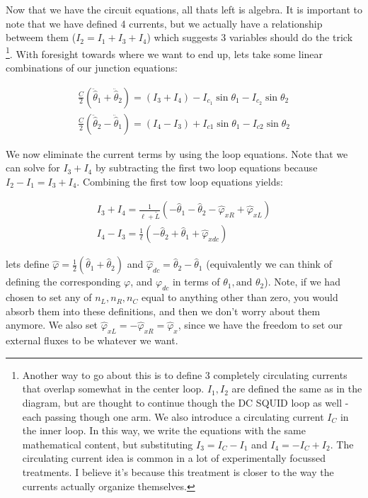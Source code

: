 \documentclass[paper=a4, twocolumn, fontsize=10pt]{article} %
\numberwithin{equation}{section} %
\numberwithin{figure}{section} %
\numberwithin{table}{section} %
\def \df#1{\hat{#1}}
\def \dl#1{#1}
\begin{document}
Now that we have the circuit equations, all thats left is algebra. It is important to note that we have defined 4 currents, but we actually have a relationship betweem them ($I_2 = I_1 + I_3 + I_4$) which suggests 3 variables should do the trick
\footnote{Another way to go about this is to define 3 completely circulating currents that overlap somewhat in the center loop. $I_1, I_2$ are defined the same as in the diagram, but are thought to continue though the DC SQUID loop as well - each passing though one arm. We also introduce a circulating current $I_C$ in the inner loop. In this way, we write the equations with the same mathematical content, but substituting $I_3 = I_C - I_1$ and $I_4 = -I_C + I_2$. The circulating current idea is common in a lot of experimentally focussed treatments. I believe it's because this treatment is closer to the way the currents actually organize themselves.}.
 With foresight towards where we want to end up, lets take some linear combinations of our junction equations:

\begin{align}
\frac{C}{2} (\ddot{\df\theta}_1 + \ddot{\df\theta}_2 ) = (I_3 + I_4) - I_{c_1} \sin \dl\theta_1 - I_{c_2} \sin \dl\theta_2
\\
\frac{C}{2} (\ddot{\df\theta}_2 - \ddot{\df\theta}_1 ) = (I_4 - I_3) +I_{c1} \sin\dl\theta_1 - I_{c2} \sin \dl\theta_2
\end{align}

We now eliminate the current terms by using the loop equations. Note that we can solve for $I_3+I_4$ by subtracting the first two loop equations because $I_2 - I_1 = I_3+I_4$. Combining the first tow loop equations yields:

\begin{align}
    I_3 + I_4 = \frac{1}{\ell+\tilde{L}}\left(- \df\theta_1 - \df\theta_2 - \df\varphi_{xR} + \df\varphi_{xL} \right)
    \\
    I_4 - I_3 =\frac{1}{\ell}\left( -\df\theta_2 + \df\theta_1 +\df\varphi_{xdc}\right)
    \end{align}


lets define $\df\varphi = \frac{1}{2}\left(\df\theta_1 + \df\theta_2\right)$ and $\df\varphi_{dc} = \df\theta_2 - \df\theta_1$ (equivalently we can think of defining the corresponding $\dl\varphi$, and $\dl\varphi_{dc}$ in terms of $\dl\theta_1,\text{and } \dl\theta_2$). Note, if we had chosen to set any of $n_L,n_R,n_C$ equal to anything other than zero, you would absorb them into these definitions, and then we don't worry about them anymore. We also set $\df\varphi_{xL} = -\df\varphi_{xR} = \df\varphi_x$, since we have the freedom to set our external fluxes to be whatever we want.
\end{document}
